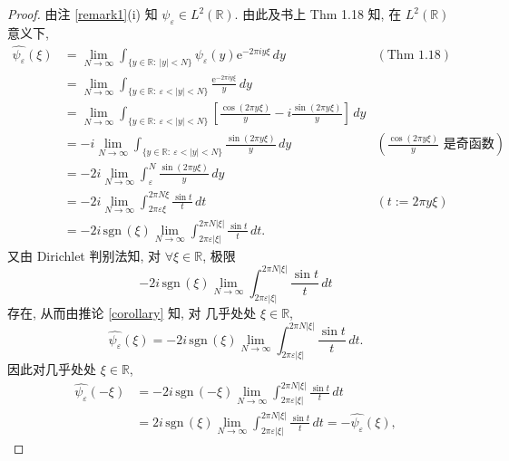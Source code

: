 \documentclass[a4paper,11pt]{article}
\theoremstyle{definition}
\def \sgn{\mathrm{\,sgn\,}}
\begin{document}
\begin{CJK*}{UTF8}{gbsn}
\begin{proof}
    由注 \ref{remark1}(i) 知  $ \psi_\varepsilon \in L^2(\mathbb{R}) $. 由此及书上 Thm 1.18 知, 
    在 $ L^2(\mathbb{R}) $ 意义下,
    \begin{align*}
         \widehat{\psi_\varepsilon} (\xi)
            &= \lim_{N \to \infty} \int_{\{y \in \mathbb{R} :\ |y| < N\}}  \psi_\varepsilon(y)
                \mathrm{e}^{-2 \pi i y \xi} \, dy  & (\text{Thm 1.18}) \\ 
            &= \lim_{N \to \infty} \int_{\{y \in \mathbb{R} :\ \varepsilon < |y| < N\}}  
                \frac{\mathrm{e}^{-2 \pi i y \xi}}{y} \, dy \\
            &= \lim_{N \to \infty} \int_{\{y \in \mathbb{R} :\ \varepsilon < |y| < N\}}  
                \left[ \frac{\cos(2 \pi y \xi)}{y} - i \frac{\sin(2 \pi y \xi)}{y} \right] \, dy \\
            &= - i \lim_{N \to \infty} \int_{\{y \in \mathbb{R} :\ \varepsilon < |y| < N\}} 
                \frac{\sin(2 \pi y \xi)}{y} \, dy 
                & \left( \frac{\cos(2 \pi y \xi)}{y} \text{ 是奇函数} \right)  \\
            &= - 2 i \lim_{N \to \infty} \int_\varepsilon^N \frac{\sin(2 \pi y \xi)}{y} \, dy \\
            &= - 2 i \lim_{N \to \infty} \int_{2 \pi \varepsilon \xi}^{2 \pi N \xi} \frac{\sin t}{t} \, dt
                & (t := 2 \pi y \xi) \\
            &= - 2 i \sgn (\xi) \lim_{N \to \infty} 
                \int_{2 \pi \varepsilon |\xi|}^{2 \pi N |\xi|} \frac{\sin t}{t} \, dt.
    \end{align*}
    又由 Dirichlet 判别法知, 对 $ \forall \xi \in \mathbb{R} $, 极限
    $$
        - 2 i \sgn (\xi) \lim_{N \to \infty} \int_{2 \pi \varepsilon |\xi|}^{2 \pi N |\xi|} \frac{\sin t}{t} \, dt
    $$
    存在, 从而由推论 \ref{corollary} 知, 对 几乎处处 $ \xi \in \mathbb{R} $, 
    $$
        \widehat{\psi_\varepsilon} (\xi)
            = - 2 i \sgn (\xi) \lim_{N \to \infty} \int_{2 \pi \varepsilon |\xi|}^{2 \pi N |\xi|} \frac{\sin t}{t} \, dt.
    $$
    因此对几乎处处 $ \xi \in \mathbb{R} $, 
    \begin{align*}
        \widehat{\psi_\varepsilon} (-\xi)
            &= - 2 i \sgn (-\xi) \lim_{N \to \infty} \int_{2 \pi \varepsilon |\xi|}^{2 \pi N |\xi|} \frac{\sin t}{t} \, dt \\
            &= 2 i \sgn (\xi) \lim_{N \to \infty} \int_{2 \pi \varepsilon |\xi|}^{2 \pi N |\xi|} \frac{\sin t}{t} \, dt
            = - \widehat{\psi_\varepsilon} (\xi),

\end{align*}
\end{proof}
\end{CJK*}
\end{document}
